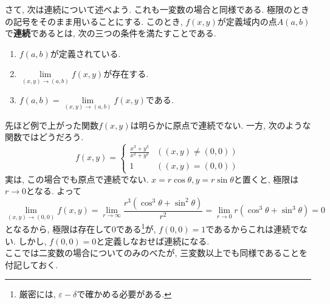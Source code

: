 \documentclass[a4j,dvipdfmx]{jsarticle}
\numberwithin{equation}{section}
\begin{document}
            さて, 次は連続について述べよう. これも一変数の場合と同様である. 極限のときの記号をそのまま用いることにする. このとき, $f(x,y)$が定義域内の点$A(a,b)$で\textbf{連続}であるとは, 次の三つの条件を満たすことである.
            \begin{enumerate}
                \item $f(a,b)$が定義されている.
                \item $\lim\limits_{(x,y)\to(a,b)}f(x,y)$が存在する.
                \item $f(a,b)=\lim\limits_{(x,y)\to(a,b)}f(x,y)$である.
            \end{enumerate}
            先ほど例で上がった関数$f(x,y)$は明らかに原点で連続でない. 一方, 次のような関数ではどうだろう.
            \begin{equation*}
                f(x,y)=\left\{\begin{array}{cc}
                    \displaystyle\frac{x^3+y^3}{x^2+y^2} & ((x,y)\neq (0,0))\\
                    1 & ((x,y)=(0,0))
                \end{array}\right.
            \end{equation*}
            実は, この場合でも原点で連続でない. $x=r\cos\theta,y=r\sin\theta$と置くと, 極限は$r\to 0$となる. よって
            \begin{equation*}
                \lim_{(x,y)\to(0,0)}f(x,y)=\lim_{r\to\infty}\frac{r^3(\cos^3\theta+\sin^2\theta)}{r^2}=\lim_{r\to 0}r(\cos^3\theta+\sin^3\theta)=0
            \end{equation*}
            となるから, 極限は存在して$0$である\footnote{厳密には, $\varepsilon-\delta$で確かめる必要がある.}が, $f(0,0)=1$であるからこれは連続でない. しかし, $f(0,0)=0$と定義しなおせば連続になる.\\

            ここでは二変数の場合についてのみのべたが, 三変数以上でも同様であることを付記しておく.
        \clearpage
\end{document}
